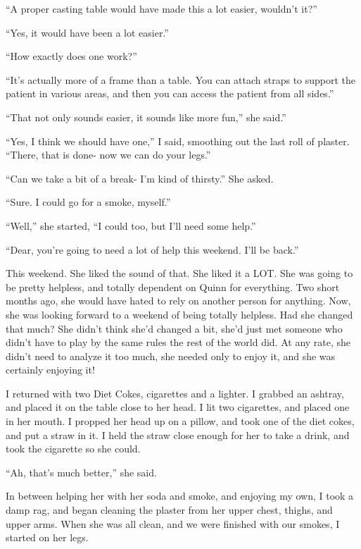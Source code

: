 ``A proper casting table would have made this a lot easier, wouldn't it?''

``Yes, it would have been a lot easier.''

``How exactly does one work?''

``It's actually more of a frame than a table. You can attach straps to support the patient
in various areas, and then you can access the patient from all sides.''

``That not only sounds easier, it sounds like more fun,'' she said.''

``Yes, I think we should have one,'' I said, smoothing out the last roll of plaster. ``There,
that is done- now we can do your legs.''

``Can we take a bit of a break- I'm kind of thirsty.'' She asked.

``Sure. I could go for a smoke, myself.''

``Well,'' she started, ``I could too, but I'll need some help.''

``Dear, you're going to need a lot of help this weekend. I'll be back.''

\begin{thought}
This weekend. She liked the sound of that. She liked it a LOT. She was going to be pretty
helpless, and totally dependent on Quinn for everything. Two short months ago, she would have
hated to rely on another person for anything. Now, she was looking forward to a weekend of being
totally helpless. Had she changed that much? She didn't think she'd changed a bit, she'd just
met someone who didn't have to play by the same rules the rest of the world did. At any rate,
she didn't need to analyze it too much, she needed only to enjoy it, and she was certainly
enjoying it!
\end{thought}

I returned with two Diet Cokes, cigarettes and a lighter. I grabbed an ashtray, and placed
it on the table close to her head. I lit two cigarettes, and placed one in her mouth. I propped
her head up on a pillow, and took one of the diet cokes, and put a straw in it. I held the straw
close enough for her to take a drink, and took the cigarette so she could.

``Ah, that's much better,'' she said.

In between helping her with her soda and smoke, and enjoying my own, I took a damp rag, and
began cleaning the plaster from her upper chest, thighs, and upper arms. When she was all clean,
and we were finished with our smokes, I started on her legs.


